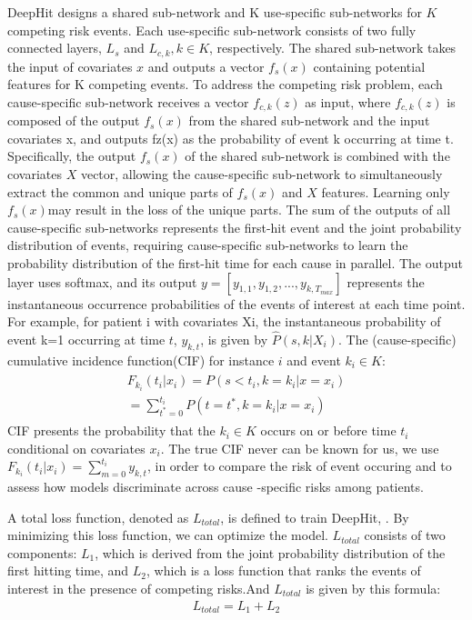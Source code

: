 \documentclass[conference]{IEEEconf}
\begin{document}
DeepHit designs a shared sub-network and K use-specific sub-networks for $K$ competing risk events. Each use-specific sub-network consists of two fully connected layers, $L_{s}$ and $L_{c,k},k\in K$, respectively. The shared sub-network takes the input of covariates $x$ and outputs a vector $f_{s}(x)$ containing potential features for K competing events. To address the competing risk problem, each cause-specific sub-network receives a vector $f_{c,k}(z)$ as input, where $f_{c,k}(z)$ is composed of the output $f_{s}(x)$ from the shared sub-network and the input covariates x, and outputs fz(x) as the probability of event k occurring at time t. Specifically, the output $f_{s}(x)$ of the shared sub-network is combined with the covariates $X$ vector, allowing the cause-specific sub-network to simultaneously extract the common and unique parts of $f_{s}(x)$ and $X$ features. Learning only $f_{s}(x)$may result in the loss of the unique parts. The sum of the outputs of all cause-specific sub-networks represents the first-hit event and the joint probability distribution of events, requiring cause-specific sub-networks to learn the probability distribution of the first-hit time for each cause in parallel. The output layer uses softmax, and its output $y=[y_{1,1}, y_{1,2},...,y_{k,T_{max}}]$ represents the instantaneous occurrence probabilities of the events of interest at each time point. For example, for patient i with covariates Xi, the instantaneous probability of event k=1 occurring at time $t$, $y_{k,t}$, is given by $\hat{P}(s, k|X_{i})$.
The (cause-specific) cumulative incidence function(CIF) for instance $i$ and event $k_{i}\in K$:
\begin{eqnarray}
	\begin{aligned}
		F_{k_{i}}(t_{i}|x_{i}) = P\left(s<t_{i},k=k_{i}|x=x_{i}\right) \\
		= \sum_{t^*=0}^{t_{i}} P\left(t=t^*,k=k_{i}|x=x_{i}\right)
	\end{aligned}
\end{eqnarray}
CIF presents the probability that the $k_{i} \in K$ occurs on or before time $t_{i}$ conditional on covariates $x_{i}$. The true CIF never can be known for us, we use 	$F_{k_{i}}(t_{i}|x_{i}) = \sum_{m=0}^{t_{i}}y_{k,t}$, in order to compare the risk of event occuring and to assess how models discriminate across cause -specific risks among patients.

A total loss function, denoted as $L_{total}$, is defined to train DeepHit, . By minimizing this loss function, we can optimize the model. $L_{total}$ consists of two components: $L_{1}$, which is derived from the joint probability distribution of the first hitting time, and $L_{2}$, which is a loss function that ranks the events of interest in the presence of competing risks.And $L_{total}$ is given by this formula:
\begin{eqnarray}
	L_{total} = L_{1}+L_{2}
\end{eqnarray}
\end{document}
